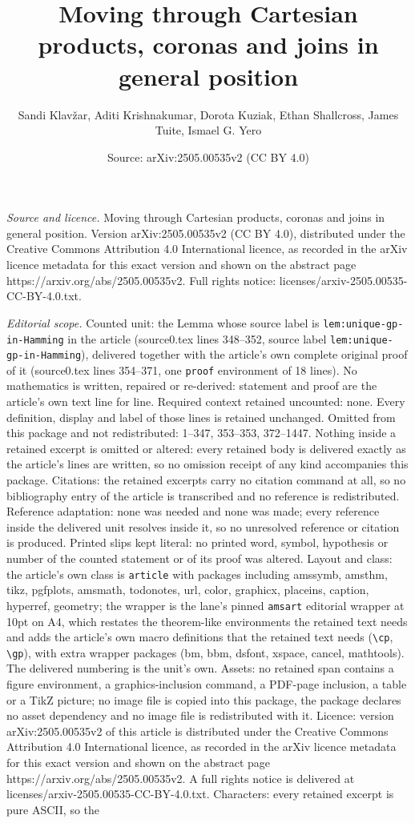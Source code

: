 \documentclass[10pt,a4paper]{amsart}
\title[Moving through Cartesian products, coronas and joins in gene]{Moving through Cartesian products, coronas and joins in general position}
\author{Sandi Klav\v{z}ar, Aditi Krishnakumar, Dorota Kuziak, Ethan Shallcross, James Tuite, Ismael G. Yero}
\date{Source: arXiv:2505.00535v2 (CC BY 4.0)}
\begin{document}
\maketitle

\noindent\emph{Source and licence.} Moving through Cartesian products, coronas and joins in general position. Version arXiv:2505.00535v2 (CC BY 4.0), distributed under the Creative Commons Attribution 4.0 International licence, as recorded in the arXiv licence metadata for this exact version and shown on the abstract page https://arxiv.org/abs/2505.00535v2. Full rights notice: licenses/arxiv-2505.00535-CC-BY-4.0.txt.\par\smallskip

\noindent\textit{Editorial scope.} Counted unit: the Lemma whose source label is \texttt{lem:unique-gp-in-Hamming} in the article (source0.tex lines 348--352, source label \texttt{lem:unique-gp-in-Hamming}), delivered together with the article's own complete original proof of it (source0.tex lines 354--371, one \texttt{proof} environment of 18 lines). No mathematics is written, repaired or re-derived: statement and proof are the article's own text line for line. Required context retained uncounted: none. Every definition, display and label of those lines is retained unchanged. Omitted from this package and not redistributed: 1--347, 353--353, 372--1447. Nothing inside a retained excerpt is omitted or altered: every retained body is delivered exactly as the article's lines are written, so no omission receipt of any kind accompanies this package. Citations: the retained excerpts carry no citation command at all, so no bibliography entry of the article is transcribed and no reference is redistributed. Reference adaptation: none was needed and none was made; every reference inside the delivered unit resolves inside it, so no unresolved reference or citation is produced. Printed slips kept literal: no printed word, symbol, hypothesis or number of the counted statement or of its proof was altered. Layout and class: the article's own class is \texttt{article} with packages including amssymb, amsthm, tikz, pgfplots, amsmath, todonotes, url, color, graphicx, placeins, caption, hyperref, geometry; the wrapper is the lane's pinned \texttt{amsart} editorial wrapper at 10pt on A4, which restates the theorem-like environments the retained text needs and adds the article's own macro definitions that the retained text needs (\texttt{\textbackslash cp}, \texttt{\textbackslash gp}), with extra wrapper packages (bm, bbm, dsfont, xspace, cancel, mathtools). The delivered numbering is the unit's own. Assets: no retained span contains a figure environment, a graphics-inclusion command, a PDF-page inclusion, a table or a TikZ picture; no image file is copied into this package, the package declares no asset dependency and no image file is redistributed with it. Licence: version arXiv:2505.00535v2 of this article is distributed under the Creative Commons Attribution 4.0 International licence, as recorded in the arXiv licence metadata for this exact version and shown on the abstract page https://arxiv.org/abs/2505.00535v2. A full rights notice is delivered at licenses/arxiv-2505.00535-CC-BY-4.0.txt. Characters: every retained excerpt is pure ASCII, so the 
\end{document}
